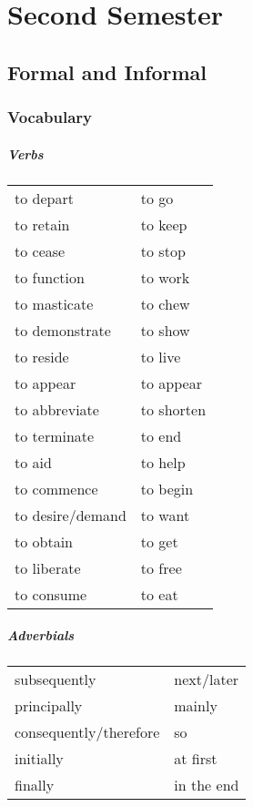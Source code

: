 \chapter{Second Semester}

\section{Formal and Informal}
\subsection{Vocabulary}
\paragraph{Verbs}
\begin{tabular}{l l}
to depart & to go\\
to retain & to keep\\
to cease & to stop\\
to function & to work\\
to masticate & to chew\\
to demonstrate & to show\\
to reside & to live\\
\hline
to appear & to appear\\
to abbreviate & to shorten\\
to terminate & to end\\
to aid & to help\\
to commence & to begin\\
to desire/demand & to want\\
to obtain & to get\\
to liberate & to free\\
to consume & to eat
\end{tabular}

\paragraph{Adverbials}
\begin{tabular}{l l}
subsequently & next/later\\
principally & mainly\\
consequently/therefore & so\\
initially & at first\\
finally & in the end
\end{tabular}

